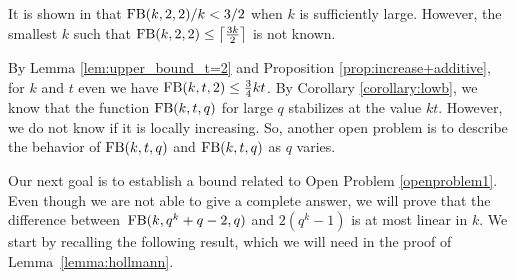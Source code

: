 \documentclass[11pt,a4paper]{article}
\theoremstyle{definition}
\newcommand{\fb}{\textnormal{FB}}
\begin{document}
It is shown in \cite{zhang2020bounds} that $\fb(k, 2, 2)/k < 3/2$ when
$k$ is sufficiently large. However, the smallest $k$ such that $\fb(k, 2, 2) \le \left\lceil \frac{3k}{2} \right\rceil$ is not known.

By Lemma \ref{lem:upper_bound_t=2} and Proposition \ref{prop:increase+additive}, for $k$ and $t$ even we have $\fb(k,t,2)\leq\frac{3}{4}kt$. By Corollary \ref{corollary:lowb}, we know that the function $\fb(k,t,q)$ for large $q$ stabilizes at the value $kt$. However, we do not know if it is locally increasing. So, another open problem is to describe the behavior of $\fb(k,t,q)$ and $\fb(k,t,q)$ as $q$ varies.  


Our next goal is to establish a bound related to Open Problem \ref{openproblem1}. Even though we are not able to give a complete answer, we will prove that the difference between~$\fb(k,q^k+q-2,q)$ and $2(q^k-1)$ is at most linear in $k$. We start by recalling the following result, which we will need in the proof of Lemma~\ref{lemma:hollmann}.
\end{document}
